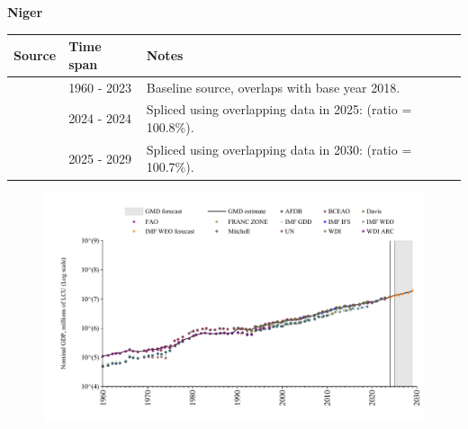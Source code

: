 \documentclass[12pt,a4paper,landscape]{article}
\begin{document}
\begin{adjustbox}{max totalsize={\paperwidth}{\paperheight},center}
\begin{minipage}[t][\textheight][t]{\textwidth}
\vspace*{0.5cm}
{}
\begin{center}
{\Large\bfseries Niger}
\end{center}
\vspace{0.5cm}
\begin{table}[H]
\centering
\small
\begin{tabular}{|l|l|l|}
\hline
\textbf{Source} & \textbf{Time span} & \textbf{Notes} \\
\hline
\rowcolor{white}\cite{WDI}& 1960 - 2023 &Baseline source, overlaps with base year 2018.\\
\rowcolor{lightgray}\cite{BCEAO}& 2024 - 2024 &Spliced using overlapping data in 2025: (ratio = 100.8\%).\\
\rowcolor{white}\cite{IMF_WEO_forecast}& 2025 - 2029 &Spliced using overlapping data in 2030: (ratio = 100.7\%).\\
\hline
\end{tabular}
\end{table}
\begin{figure}[H]
\centering
\includegraphics[width=\textwidth,height=0.6\textheight,keepaspectratio]{graphs/NER_nGDP.pdf}
\end{figure}
\end{minipage}
\end{adjustbox}
\end{document}
